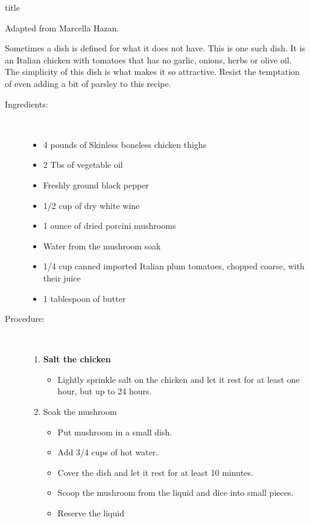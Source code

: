 \documentclass [11pt, letterpaper] {article}
\begin{document}
 {title}
\begin{flushright}
{\hspace{4in} Adapted from Marcella Hazan.}
\end{flushright}
\vspace{0.5in}


Sometimes a dish is defined for what it does not have. This is one such dish. It is an Italian chicken with tomatoes that has no garlic, onions, herbs or olive oil. The simplicity of this dish is what makes it so attractive. Resist the temptation of even adding a bit of parsley to this recipe.

\begin{description}

\item[Ingredients:]\ \\
	\begin{itemize}
	\item	4 pounds of Skinless boneless chicken thighs 
	\item 2 Tbs of vegetable oil
	\item Freshly ground black pepper
	\item 1/2 cup of dry white wine
	\item 1 ounce of dried porcini mushrooms
	\item Water from the mushroom soak
	\item 1/4 cup canned imported Italian plum tomatoes, chopped coarse, with their juice
	\item 1 tablespoon of butter
	\end{itemize}

\item[Procedure:]\ \\

	\begin{enumerate}

	\item {\bf Salt the chicken}
	\begin{itemize}
	\item Lightly sprinkle salt on the chicken and let it rest for at least one hour, but up to 24 hours.
	\end{itemize}

	\item {Soak the mushroom}
	\begin{itemize}
	\item Put mushroom in a small dish.
	\item Add 3/4 cups of hot water.
	\item Cover the dish and let it rest for at least 10 minutes.
	\item Scoop the mushroom from the liquid and dice into small pieces.
	\item Reserve the liquid
	\end{itemize}
	

\end{enumerate}
\end{description}
\end{document}
